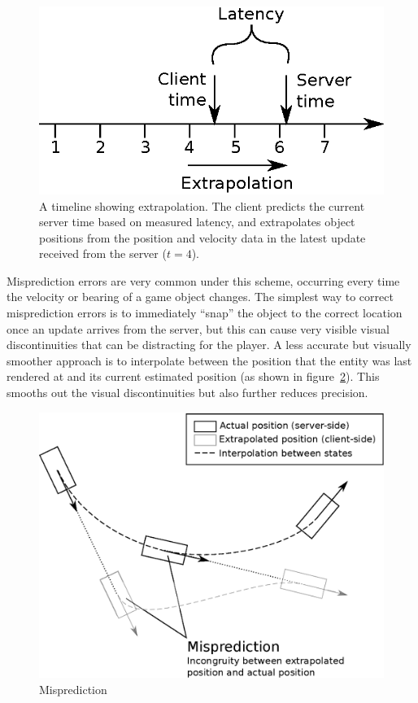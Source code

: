 \documentclass[conference]{IEEEtran}
\begin{document}
	\begin{figure}
		\centering\includegraphics[width=\linewidth]{figures/extrapolation_timeline.eps}
		\caption{A timeline showing extrapolation. The client predicts the current server time based on measured latency, and extrapolates object positions from the position and velocity data in the latest update received from the server ($t = 4$).}
		\label{fig:extrapolation_timeline}
	\end{figure}

	Misprediction errors are very common under this scheme, occurring every time the velocity or bearing of a game object changes. The simplest way to correct misprediction errors is to immediately ``snap'' the object to the correct location once an update arrives from the server, but this can cause very visible visual discontinuities that can be distracting for the player. A less accurate but visually smoother approach is to interpolate between the position that the entity was last rendered at and its current estimated position (as shown in figure~\ref{fig:extrapolation}). This smooths out the visual discontinuities but also further reduces precision.

	\begin{figure}
		\centering\includegraphics[width=\linewidth]{figures/extrapolation.eps}
		\caption{Misprediction}
		\label{fig:extrapolation}
	\end{figure}
\end{document}

